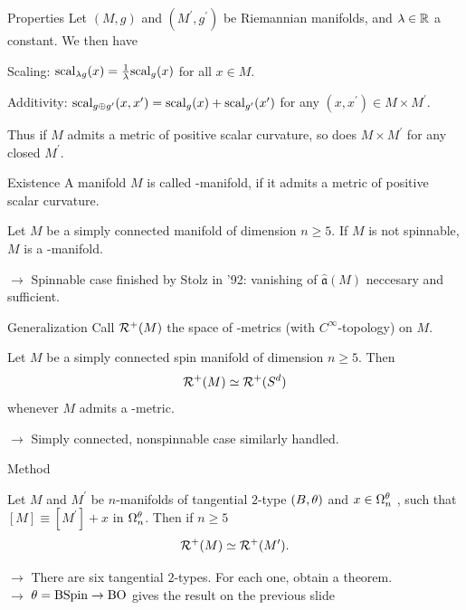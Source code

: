 \documentclass{presis}
\begin{document}
\begin{frame}{Properties}
    Let $(M,g)$ and $(M^\prime,g^\prime)$ be Riemannian manifolds, and $\lambda\in \mathbb{R}$ a constant.\pause 
    We then have
    \begin{vfilleditems}
        \item Scaling: $\mathrm{scal}_{\lambda g}(x) = \frac{1}{\lambda} \mathrm{scal}_g(x)$ for all $x\in M$.\pause
        \item Additivity: $\mathrm{scal}_{g\oplus g^\prime}(x,x^\prime) = \mathrm{scal}_g(x) + \mathrm{scal}_{g^\prime}(x^\prime)$ for any $(x,x^\prime)\in M\times M^\prime$.
    \end{vfilleditems}\pause
    Thus if $M$ admits a metric of positive scalar curvature, so does $M\times M^\prime$ for any closed $M^\prime$.
\end{frame}

\begin{frame}{Existence}
    A manifold $M$ is called \psc-manifold, if it admits a metric of positive scalar curvature.\pause
    \begin{thm}
    Let $M$ be a simply connected manifold of dimension $n \geq 5$. If $M$ is not spinnable, $M$ is a \psc-manifold.
    \end{thm}\pause
    $\rightarrow$ Spinnable case finished by Stolz in '92: vanishing of $\hat{\mathfrak{a}}(M)$ neccesary and sufficient.
\end{frame}


\begin{frame}{Generalization}
    Call $\mathcal{R}^+(M)$ the space of \psc-metrics (with $C^\infty$-topology) on $M$.\pause
    \begin{thm}
        Let $M$ be a simply connected spin manifold of dimension $n\geq 5$. Then
        \begin{equation*}
            \mathcal{R}^+(M) \simeq \mathcal{R}^+(S^d)
        \end{equation*}
        whenever $M$ admits a \psc-metric.
    \end{thm}\pause
    $\rightarrow$ Simply connected, nonspinnable case similarly handled.
\end{frame}

\begin{frame}{Method}
    \begin{thm}
        Let $M$ and $M^\prime$ be $n$-manifolds of tangential $2$-type $(B,\theta)$ and $x\in \Omega_n^\theta$ \good, such that $[M] \equiv [M^\prime] + x$ in $\Omega_n^\theta$.
    Then if $n\geq 5$
    \begin{equation*}
        \mathcal{R}^+(M) \simeq \mathcal{R}^+(M^\prime).
    \end{equation*}
    \end{thm}\pause
    $\rightarrow$ There are six tangential $2$-types. For each one, obtain a theorem.\\\pause
    $\rightarrow$ $\theta=\mathrm{BSpin}\to\mathrm{BO}$ gives the result on the previous slide
\end{frame}
\end{document}
